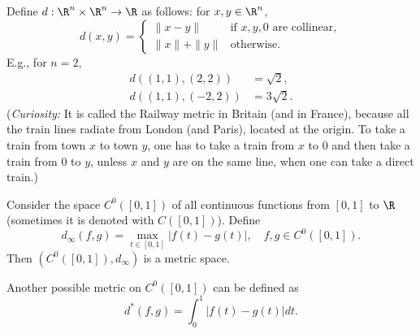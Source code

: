\begin{example}\label{railway}
Define $d : \R^n \times \R^n \to \R$ as follows: for $x,y \in \R^n$,
\[
d(x,y) = \begin{cases} \|x - y\| & \text{if $x,y,0$ are collinear}, \\ \|x\| + \|y\| & \text{otherwise}. \end{cases}
\]
E.g., for $n = 2$,
\begin{align*}
d((1,1),(2,2)) & = \sqrt{2}, \\
d((1,1),(-2,2)) & = 3\sqrt{2}.
\end{align*}
(\textit{Curiosity:} It is called the Railway metric in Britain (and in France), because all the train lines radiate from London (and Paris), located at the origin. To take a train from town $x$ to town $y$, one has to take a train from $x$ to $0$ and then take a train from $0$ to $y$, unless $x$ and $y$ are on the same line, when one can take a direct train.)

\medskip


%
%
\end{example}



\begin{example}\label{continuous_functions}
Consider the space $C^0([0,1])$ of all continuous functions from $[0,1]$ to $\R$ (sometimes it is denoted with $C([0,1])$).
Define
\[
d_\infty(f,g) = \max_{t \in [0,1]} |f(t) - g(t)|, \quad f,g \in C^0([0,1]).
\]
Then $(C^0([0,1]),d_\infty)$ is a metric space. 

\quad 

Another possible metric on $C^0([0,1])$ can be defined as 
$$
d^\ast(f,g) = \int_0^1|f(t)-g(t)|dt.
$$

\end{example}


